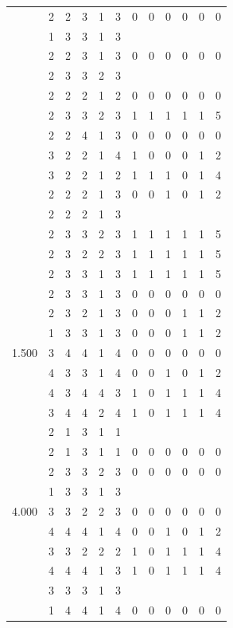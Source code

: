 \documentclass[]{book}
\theoremstyle{definition}
\theoremstyle{definition}
\theoremstyle{definition}
\theoremstyle{remark}
\begin{document}
\begin{table}
{\begin{tabular}[t]{rrrrrrrrrrrr}
 & 2 & 2 & 3 & 1 & 3 & 0 & 0 & 0 & 0 & 0 & 0\\
 & 1 & 3 & 3 & 1 & 3 &  &  &  &  &  & \\
 & 2 & 2 & 3 & 1 & 3 & 0 & 0 & 0 & 0 & 0 & 0\\
 & 2 & 3 & 3 & 2 & 3 &  &  &  &  &  & \\
 & 2 & 2 & 2 & 1 & 2 & 0 & 0 & 0 & 0 & 0 & 0\\
 & 2 & 3 & 3 & 2 & 3 & 1 & 1 & 1 & 1 & 1 & 5\\
 & 2 & 2 & 4 & 1 & 3 & 0 & 0 & 0 & 0 & 0 & 0\\
 & 3 & 2 & 2 & 1 & 4 & 1 & 0 & 0 & 0 & 1 & 2\\
 & 3 & 2 & 2 & 1 & 2 & 1 & 1 & 1 & 0 & 1 & 4\\
 & 2 & 2 & 2 & 1 & 3 & 0 & 0 & 1 & 0 & 1 & 2\\
 & 2 & 2 & 2 & 1 & 3 &  &  &  &  &  & \\
 & 2 & 3 & 3 & 2 & 3 & 1 & 1 & 1 & 1 & 1 & 5\\
 & 2 & 3 & 2 & 2 & 3 & 1 & 1 & 1 & 1 & 1 & 5\\
 & 2 & 3 & 3 & 1 & 3 & 1 & 1 & 1 & 1 & 1 & 5\\
 & 2 & 3 & 3 & 1 & 3 & 0 & 0 & 0 & 0 & 0 & 0\\
 & 2 & 3 & 2 & 1 & 3 & 0 & 0 & 0 & 1 & 1 & 2\\
 & 1 & 3 & 3 & 1 & 3 & 0 & 0 & 0 & 1 & 1 & 2\\
1.500 & 3 & 4 & 4 & 1 & 4 & 0 & 0 & 0 & 0 & 0 & 0\\
 & 4 & 3 & 3 & 1 & 4 & 0 & 0 & 1 & 0 & 1 & 2\\
 & 4 & 3 & 4 & 4 & 3 & 1 & 0 & 1 & 1 & 1 & 4\\
 & 3 & 4 & 4 & 2 & 4 & 1 & 0 & 1 & 1 & 1 & 4\\
 & 2 & 1 & 3 & 1 & 1 &  &  &  &  &  & \\
 & 2 & 1 & 3 & 1 & 1 & 0 & 0 & 0 & 0 & 0 & 0\\
 & 2 & 3 & 3 & 2 & 3 & 0 & 0 & 0 & 0 & 0 & 0\\
 & 1 & 3 & 3 & 1 & 3 &  &  &  &  &  & \\
4.000 & 3 & 3 & 2 & 2 & 3 & 0 & 0 & 0 & 0 & 0 & 0\\
 & 4 & 4 & 4 & 1 & 4 & 0 & 0 & 1 & 0 & 1 & 2\\
 & 3 & 3 & 2 & 2 & 2 & 1 & 0 & 1 & 1 & 1 & 4\\
 & 4 & 4 & 4 & 1 & 3 & 1 & 0 & 1 & 1 & 1 & 4\\
 & 3 & 3 & 3 & 1 & 3 &  &  &  &  &  & \\
 & 1 & 4 & 4 & 1 & 4 & 0 & 0 & 0 & 0 & 0 & 0\\

\end{tabular}}
\end{table}
\end{document}
